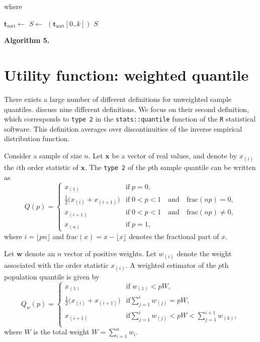 \documentclass[a4paper,oneside,11pt,DIV=12]{scrartcl}
\newcommand{\code}[1]{{\texttt{#1}}}
\begin{document}
\noindent where
\begin{algorithmic}[1]
		\State $\bm t_{\mathrm{sort}} \gets$  
		\State $S \gets$  $(\bm t_{\mathrm{sort}}[0..k])$
		\State \Return $S$ 
	\EndFunction
\end{algorithmic}




\vspace{1em}
\noindent \textbf{\sffamily Algorithm 5.}  





\section{Utility function: weighted quantile}\label{sec:utility}
There exists a large number of different definitions for unweighted sample quantiles. \citet{hyndman_fan_1996} discuss nine different definitions. We focus on their second definition, which corresponds to \code{type 2} in the \code{stats::quantile} function of the \code{R} statistical software. This definition averages over discontinuities of the inverse empirical distribution function. 

Consider a sample of size $n$. Let $\bm x$ be a vector of real values, and denote by $x_{(i)}$ the $i$th order statistic of $\bm x$. The \code{type 2} of the $p$th sample quantile can be written as 
\begin{equation}
	Q(p) = \begin{cases}
		x_{(1)} & \text{if} \; p = 0, \\
		\frac{1}{2}\big(x_{(i)} + x_{(i+1)}\big) & \text{if} \; 0 < p < 1 \quad \text{and} \quad \mathrm{frac}(np) = 0, \\
 		x_{(i+1)} & \text{if} \; 0 < p < 1 \quad \text{and} \quad \mathrm{frac}(np) \neq 0, \\
		x_{(n)} & \text{if} \; p = 1,
	\end{cases}
\end{equation}
\noindent where $i=\lfloor pn\rfloor$ and $\mathrm{frac}(x) = x - \lfloor x \rfloor$ denotes the fractional part of $x$.

Let $\bm w$ denote an $n$ vector of positive weights. Let $w_{(i)}$ denote the weight associated with the order statistic $x_{(i)}$. A weighted estimator of the $p$th population quantile is given by 
\begin{equation}
	Q_w(p) = \begin{cases}
		x_{(1)} & \text{if} \; w_{(1)} < p W, \\
		\frac{1}{2}\big(x_{(i)} + x_{(i+1)}\big) & \text{if} \sum_{j=1}^i w_{(j)} = p W, \\ 
		x_{(i+1)} & \text{if} \sum_{j=1}^i w_{(j)} < p W < \sum_{j=1}^{i+1} w_{(k)}, \\
	\end{cases}
\end{equation}
\noindent where $W$ is the total weight $W = \sum_{i=1}^n w_i$. 
\end{document}
